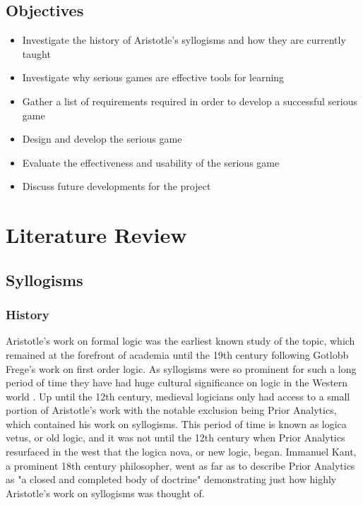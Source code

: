 \documentclass[12pt,a4paper]{report}
\begin{document}
\section{Objectives}

\begin{itemize}
  \item Investigate the history of Aristotle's syllogisms and how they are currently taught
  \item Investigate why serious games are effective tools for learning
  \item Gather a list of requirements required in order to develop a successful serious game
  \item Design and develop the serious game
  \item Evaluate the effectiveness and usability of the serious game
  \item Discuss future developments for the project
\end{itemize}


\chapter{Literature Review}
\section{Syllogisms}
\subsection{History}

Aristotle's work on formal logic was the earliest known study of the topic, which remained at the forefront of academia until the 19th century following Gotlobb Frege's work on first order logic. As syllogisms were so prominent for such a long period of time they have had huge cultural significance on logic in the Western world \citep{sep-aristotle-logic}. Up until the 12th century, medieval logicians only had access to a small portion of Aristotle's work with the notable exclusion being Prior Analytics, which contained his work on syllogisms. This period of time is known as logica vetus, or old logic, and it was not until the 12th century when Prior Analytics resurfaced in the west that the logica nova, or new logic, began. Immanuel Kant, a prominent 18th century philosopher, went as far as to describe Prior Analytics as "a closed and completed body of doctrine" demonstrating just how highly Aristotle's work on syllogisms was thought of.
\end{document}
